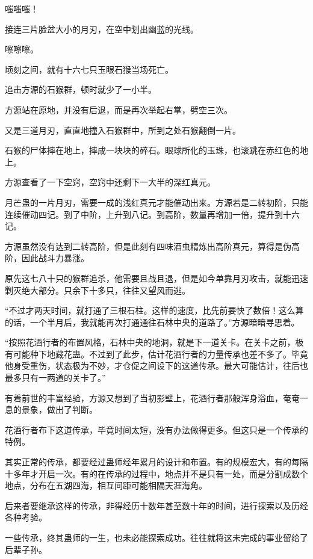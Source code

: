 
\begin{this_body}

嗤嗤嗤！

接连三片脸盆大小的月刃，在空中划出幽蓝的光线。

嚓嚓嚓。

顷刻之间，就有十六七只玉眼石猴当场死亡。

追击方源的石猴群，顿时就少了一小半。

方源站在原地，并没有后退，而是再次举起右掌，劈空三次。

又是三道月刃，直直地撞入石猴群中，所到之处石猴翻倒一片。

石猴的尸体摔在地上，摔成一块块的碎石。眼球所化的玉珠，也滚跳在赤红色的地上。

方源查看了一下空窍，空窍中还剩下一大半的深红真元。

月芒蛊的一片月刃，需要一成的浅红真元才能催动出来。方源若是二转初阶，只能连续催动四记。到了中阶，上升到八记。到高阶，数量再增加一倍，提升到十六记。

方源虽然没有达到二转高阶，但是此刻有四味酒虫精炼出高阶真元，算得是伪高阶，因此战斗力暴涨。

原先这七八十只的猴群追杀，他需要且战且退，但是如今单靠月刃攻击，就能迅速剿灭绝大部分。只余下十多只，往往又望风而逃。

“不过才两天时间，就打通了三根石柱。这样的速度，比先前要快了数倍！这么算的话，一个半月后，我就能再次打通通往石林中央的道路了。”方源暗暗寻思着。

“按照花酒行者的布置风格，石林中央的地洞，就是下一道关卡。在关卡之前，极有可能种下地藏花蛊。不过到了此步，估计花酒行者的力量传承也差不多了。毕竟他身受重伤，状态极为不妙，才仓促之间设下的这道传承。最大可能估计，往后也最多只有一两道的关卡了。”

有着前世的丰富经验，方源又想到了当初影壁上，花酒行者那般浑身浴血，奄奄一息的景象，做出了判断。

花酒行者布下这道传承，毕竟时间太短，没有办法做得更多。但这只是一个传承的特例。

其实正常的传承，都要经过蛊师经年累月的设计和布置。有的规模宏大，有的每隔十多年才开启一次。有的在传承的过程中，地点并不是只有一处，而是分割成数个地点，分布在五湖四海，相互间距可能相隔天涯海角。

后来者要继承这样的传承，非得经历十数年甚至数十年的时间，进行探索以及历经各种考验。

一些传承，终其蛊师的一生，也未必能探索成功。往往就将这未完成的事业留给了后辈子孙。


\end{this_body}
